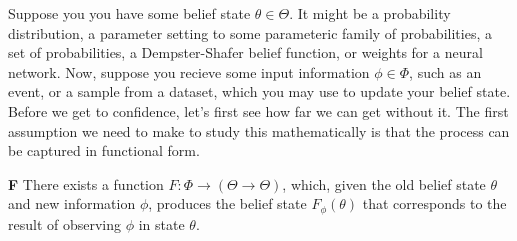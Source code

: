 Suppose you you have some belief state $\theta \in \Theta$.
It might be
a probability distribution,
a parameter setting to some parameteric family of probabilities,
a set of probabilities, a Dempster-Shafer belief function, or
weights for a neural network.
Now, suppose you recieve some input information $\phi \in \Phi$, such as an event, or a sample from a dataset, which you may use to update your belief state.
%
Before we get to confidence, let's first see how far we can get without it.
The first assumption we need to make to study this mathematically is that the process can be captured in functional form.
\begin{CFaxioms}
	\item[\textbf{F}]
		There exists a function
		$F : \Phi \to ( \Theta \to \Theta)$,
		which, given the old belief state $\theta$ and new information $\phi$, produces the belief state $F_\phi(\theta)$ that corresponds to the result of observing $\phi$ in state $\theta$.
\end{CFaxioms}

